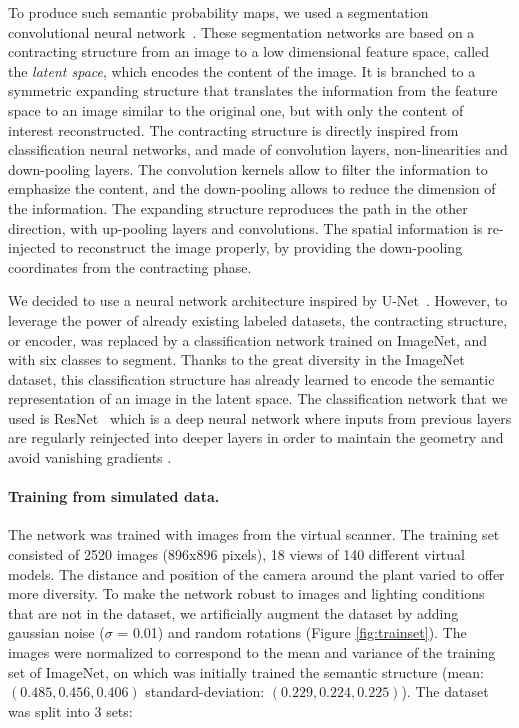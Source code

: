 To produce such semantic probability maps, we used a segmentation
convolutional neural network~\cite{guo_review_2018}. These segmentation networks
are based on a contracting structure from an image to a low dimensional
feature space, called the \emph{latent space}, which encodes the content of the image. It is branched
to a symmetric expanding structure that translates the information from
the feature space to an image similar to the original one, but with
only the content of interest reconstructed. The contracting structure
is directly inspired from classification neural networks, and made
of convolution layers, non-linearities and down-pooling layers. The
convolution kernels allow to filter the information to emphasize
the content, and the down-pooling allows to reduce the dimension
of the information. The expanding structure reproduces the path in
the other direction, with up-pooling layers and convolutions. The
spatial information is re-injected to reconstruct the image properly,
by providing the down-pooling coordinates from the contracting phase.


We decided to use a neural network architecture inspired by U-Net~\cite{ronneberger_u-net:_2015}. However, to leverage the power of
already existing labeled datasets, the contracting
structure, or encoder, was replaced by a classification network trained
on ImageNet, and with six classes to segment. Thanks to the great diversity
in the ImageNet dataset, this classification
structure has already learned to encode the semantic
representation of an image in the latent space. The classification network that we used is
ResNet~\cite{he_deep_2015} which is a deep neural network where inputs
from previous layers are regularly reinjected into deeper layers
in order to maintain the geometry and avoid vanishing gradients
\cite{hochreiter_vanishing_1998}.

\paragraph{Training from simulated data.} The network was trained with
images from the virtual scanner. The training set consisted of 2520 images (896x896 pixels), 18 views of 140 different virtual models. The distance and position of the camera around the plant varied to offer more diversity. To make the network robust to images and lighting conditions that are not in the dataset, we artificially augment the dataset by adding gaussian noise ($\sigma$ = 0.01) and random rotations (Figure \ref{fig:trainset}). The images were normalized to correspond to the mean and variance of the training set of ImageNet, on which was initially trained the semantic structure (mean: $(0.485, 0.456, 0.406)$ standard-deviation: $(0.229, 0.224, 0.225)$). 
The dataset was split into 3 sets:


